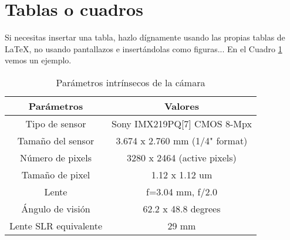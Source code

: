 \section{Tablas o cuadros}

Si necesitas insertar una tabla, hazlo dígnamente usando las propias tablas de \LaTeX, no usando pantallazos e insertándolas como figuras... En el Cuadro \ref{cuadro:ejemplo} vemos un ejemplo.

\begin{table}[H]
\begin{center}
\begin{tabular}{|c|c|}
\hline
\textbf{Parámetros} & \textbf{Valores} \\
\hline
Tipo de sensor & Sony IMX219PQ[7] CMOS 8-Mpx \\
Tamaño del sensor & 3.674 x 2.760 mm (1/4" format) \\
Número de pixels & 3280 x 2464 (active pixels) \\
Tamaño de pixel & 1.12 x 1.12 um \\
Lente & f=3.04 mm, f/2.0 \\
Ángulo de visión & 62.2 x 48.8 degrees \\
Lente SLR equivalente & 29 mm \\
\hline
\end{tabular}
\caption{Parámetros intrínsecos de la cámara}
\label{cuadro:ejemplo}
\end{center}
\end{table}



